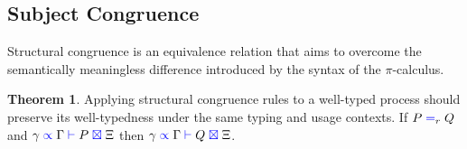 \documentclass[a4paper,UKenglish,cleveref, autoref, thm-restate,authorcolumns]{lipics-v2019}
\theoremstyle{definition}
\newtheorem{nitheorem}[theorem]{Theorem}
\newcommand{\picalc}{$\pi$-calculus}
\newcommand{\type}[1]{\textcolor{blue}{\operatorname{#1}}}
\newcommand{\types}[4]{#1 \; \type{\propto} \; #2 \; \type{\vdash} \; #3 \; \type{\boxtimes} \; #4}
\newcommand{\eq}[1]{\; \type{=}_{#1} \;}
\begin{document}
\subsection{Subject Congruence}
\label{subject-congruence}

Structural congruence is an equivalence relation that aims to overcome the semantically meaningless difference introduced by the syntax of the \picalc{}.

\begin{nitheorem}
  \label{thm:subject-congruence}
  Applying structural congruence rules to a well-typed process should preserve its well-typedness under the same typing and usage contexts.
  If $P \eq{r} Q$ and $\types{\gamma}{\Gamma}{P}{\Xi}$ then $\types{\gamma}{\Gamma}{Q}{\Xi}$.
\end{nitheorem}
\end{document}
